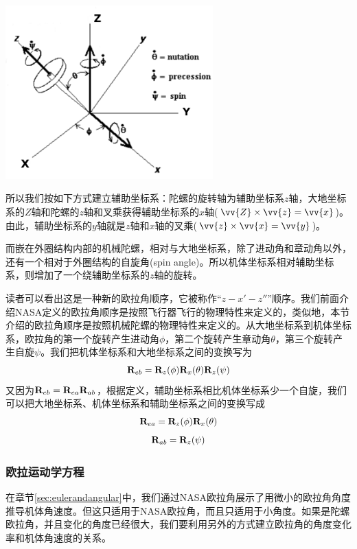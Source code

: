 \documentclass[11pt]{article}
\begin{document}
\begin{center}
\includegraphics[width=0.6\textwidth]{images/gyroframe1.png}
\end{center}


所以我们按如下方式建立辅助坐标系：陀螺的旋转轴为辅助坐标系$z$轴，大地坐标系的$Z$轴和陀螺的$z$轴和叉乘获得辅助坐标系的$x$轴($\vv{Z} \times \vv{z} = \vv{x}$)。由此，辅助坐标系的$y$轴就是$z$轴和$x$轴的叉乘($\vv{z} \times \vv{x} = \vv{y}$)。

而嵌在外圈结构内部的机械陀螺，相对与大地坐标系，除了进动角和章动角以外，还有一个相对于外圈结构的自旋角(spin angle)。所以机体坐标系相对辅助坐标系，则增加了一个绕辅助坐标系的$z$轴的旋转。

读者可以看出这是一种新的欧拉角顺序，它被称作“$z-x'-z''$”顺序。我们前面介绍NASA定义的欧拉角顺序是按照飞行器飞行的物理特性来定义的，类似地，本节介绍的欧拉角顺序是按照机械陀螺的物理特性来定义的。从大地坐标系到机体坐标系，欧拉角的第一个旋转产生进动角$\phi$，第二个旋转产生章动角$\theta$，第三个旋转产生自旋$\psi$。我们把机体坐标系和大地坐标系之间的变换写为
$$
{\bf R}_{eb} = {\bf R}_z(\phi){\bf R}_x(\theta){\bf R}_z(\psi)
$$
又因为${\bf R}_{eb} = {\bf R}_{ea}{\bf R}_{ab}$，根据定义，辅助坐标系相比机体坐标系少一个自旋，我们可以把大地坐标系、机体坐标系和辅助坐标系之间的变换写成
$$
{\bf R}_{ea} = {\bf R}_z(\phi){\bf R}_x(\theta)
$$
$$
{\bf R}_{ab} = {\bf R}_z(\psi)
$$
\subsubsection{欧拉运动学方程}
在章节\ref{sec:eulerandangular}中，我们通过NASA欧拉角展示了用微小的欧拉角角度推导机体角速度。但这只适用于NASA欧拉角，而且只适用于小角度。如果是陀螺欧拉角，并且变化的角度已经很大，我们要利用另外的方式建立欧拉角的角度变化率和机体角速度的关系。
\end{document}
